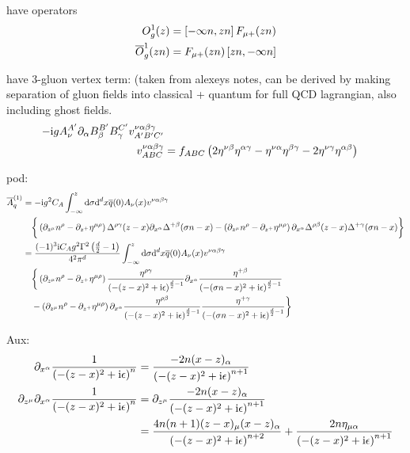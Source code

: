 \ifdefined\mainprogram{}
\else

\fi

have operators
\begin{align}
	O_{g}^{1}(z) 
	&=
	\left[-\infty n,zn \right] F_{\mu +} (zn)
	\\
	\overline {O}_{g}^{1}(zn) 
	&=
	F_{\mu +}(zn)\left[zn,-\infty n  \right]
\end{align}

have 3-gluon vertex term: (taken from alexeys notes, can be derived by making separation of gluon fields into classical + quantum for full QCD lagrangian, also including ghost fields. 
\begin{align}
	-\text{i} g A_\nu^{A'} \partial_\alpha B_\beta^{B'} B_\gamma^{C'} v^{\nu\alpha\beta\gamma}_{A'B'C'}
	\\
	v^{\nu\alpha\beta\gamma}_{ABC}
	&=f_{ABC}\left(2\eta^{\nu \beta}\eta^{\alpha\gamma} - \eta^{\nu \alpha}\eta^{\beta\gamma} -2\eta^{\nu\gamma}\eta^{\alpha\beta}\right)
\end{align}


pod: 
\begin{align}
	\overline A_q^{(1)}
	&=
	-\text{i} g^2 C_A \int_{-\infty}^z \text{d} \sigma \text{d} ^d x  \overline q(0) A_\nu (x) v^{\nu\alpha\beta\gamma}
	\\&~~~
	\bigg\{ \left( \partial_{z^\mu} n^\rho - \partial_{z^+} \eta^{\mu \rho} \right) \Delta^{\rho \gamma} (z-x) \partial_{x^\alpha} \Delta^{+ \beta}(\sigma n -x) - \left(\partial_{z^\mu} n^\rho - \partial_{z^+} \eta ^{\mu \rho} \right) \partial_{x^\alpha} \Delta^{\rho \beta} (z-x) \Delta^{+\gamma} (\sigma n -x) \bigg\}
	\\
	&=
	\frac{(-1)^3 \text{i} C_A g^2 \Gamma^2\left( \frac{d}{2} -1\right)}{4^2\pi^{d}} \int_{-\infty}^z \text{d} \sigma \text{d} ^d x  \overline q(0) A_\nu (x) v^{\nu\alpha\beta\gamma}
	\\&~~~
	\bigg\{ \left( \partial_{z^\mu} n^\rho - \partial_{z^+} \eta^{\mu \rho} \right) \frac{\eta^{\rho \gamma}}{ \left(-(z-x)^2+\text{i}\epsilon\right)^{\frac{d}{2}-1}} \partial_{x^\alpha} \frac{\eta^{+\beta}}{ \left(-(\sigma n -x)^2+\text{i}\epsilon\right)^{\frac{d}{2}-1}} 
	\\&~~~
	- \left(\partial_{z^\mu} n^\rho - \partial_{z^+} \eta ^{\mu \rho} \right) \partial_{x^\alpha} \frac{\eta^{\rho \beta}}{ \left(-(z-x)^2+\text{i}\epsilon\right)^{\frac{d}{2}-1}} \frac{\eta^{+ \gamma}}{ \left(-(\sigma n -x)^2+\text{i}\epsilon\right)^{\frac{d}{2}-1}} \bigg\}
\end{align}

Aux:
\begin{align}
	\partial_{x^\alpha} \frac{1}{ \left(-(z-x)^2+\text{i}\epsilon\right)^{n}}
	&=
	\frac{-2n(x-z)_\alpha}{ \left(-(z-x)^2+\text{i}\epsilon\right)^{n+1}}
	\\
	\partial_{z^\mu}\partial_{x^\alpha} \frac{1}{ \left(-(z-x)^2+\text{i}\epsilon\right)^{n}}
	&=
	\partial_{z^\mu}\frac{-2n(x-z)_\alpha}{ \left(-(z-x)^2+\text{i}\epsilon\right)^{n+1}}
	\\
	&=
	\frac{4n(n+1)(z-x)_\mu(x-z)_\alpha}{ \left(-(z-x)^2+\text{i}\epsilon\right)^{n+2}} + 
	\frac{2n\eta_{\mu\alpha}}{ \left(-(z-x)^2+\text{i}\epsilon\right)^{n+1}}
\end{align}

